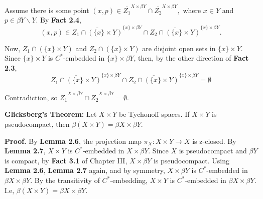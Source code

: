 \documentclass{article}
\begin{document}
\vskip 15pt

 Assume there is some point $(x,p)\in \overline{Z_1}^{X\times \beta Y}\cap \overline{Z_2}^{X\times \beta Y},$ where $x\in Y$ and $p\in \beta Y\backslash Y$. By \textbf{Fact 2.4}, $$(x,p)\in \overline{Z_1\cap (\{x\}\times Y)}^{\{x\}\times \beta Y} \cap \overline{Z_2\cap (\{x\}\times Y)}^{\{x\}\times \beta Y}.$$

\vskip 10pt

Now, $Z_1\cap (\{x\}\times Y)$ and $Z_2\cap (\{x\} \times Y)$ are disjoint open sets in $\{x\}\times Y$. Since $\{x\}\times Y$ is $C^*$-embedded in $\{x\}\times \beta Y$, then, by the other direction of \textbf{Fact 2.3}, $$\overline{Z_1\cap (\{x\}\times Y)}^{\{x\}\times \beta Y} \cap \overline{Z_2\cap (\{x\}\times Y)}^{\{x\}\times \beta Y}=\emptyset$$

Contradiction, so $\overline{Z_1}^{X\times \beta Y} \cap \overline{Z_2}^{X\times \beta Y} =\emptyset$.  





\vskip 40pt





\textbf{Glicksberg's Theorem: } Let $X\times Y$ be Tychonoff spaces. If $X\times Y$ is pseudocompact, then $\beta(X\times Y)=\beta X\times \beta Y$. 

\vskip 20pt

\textbf{Proof. } By \textbf{Lemma 2.6}, the projection map $\pi_X: X\times Y\rightarrow X$ is z-closed. By \textbf{Lemma 2.7}, $X\times Y$ is $C^*$-embedded in $X\times \beta Y$. Since $X$ is pseudocompact and $\beta Y$ is compact, by \textbf{Fact 3.1} of Chapter III, $X\times \beta Y$ is pseudocompact. Using \textbf{Lemma 2.6}, \textbf{Lemma 2.7} again, and by symmetry, $X\times \beta Y$ is $C^*$-embedded in $\beta X\times \beta Y$. By the transitivity of $C^*$-embedding, $X\times Y$ is $C^*$-embedded in $\beta X\times \beta Y$. I.e, $\beta (X\times Y)=\beta X\times \beta Y$.
\end{document}
